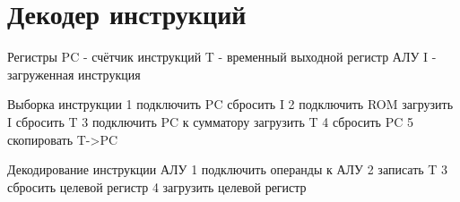 \chapter{Декодер инструкций}

Регистры
 PC - счётчик инструкций
 T - временный выходной регистр АЛУ
 I - загруженная инструкция

Выборка инструкции
 1 подключить PC
   сбросить I
 2 подключить ROM
   загрузить I
   сбросить T
 3 подключить PC к сумматору
   загрузить T
 4 сбросить PC
 5 скопировать T->PC

Декодирование инструкции АЛУ
 1 подключить операнды к АЛУ
 2 записать T
 3 сбросить целевой регистр
 4 загрузить целевой регистр
